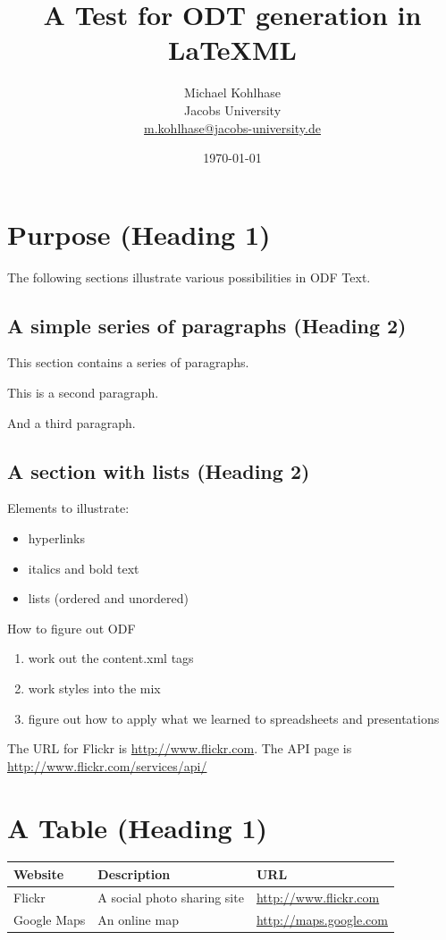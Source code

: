 \documentclass{article}
\title{A Test for ODT generation in LaTeXML}
\author{Michael Kohlhase\\Jacobs University\\\url{m.kohlhase@jacobs-university.de}}
\date{\today}
\begin{document}
\maketitle

\section{Purpose (Heading 1)}

The following sections illustrate various possibilities in ODF Text.

\subsection{A simple series of paragraphs (Heading 2)}

This section contains a series of paragraphs.

This is a second paragraph.

And a third paragraph.

\subsection{A section with lists (Heading 2)}
Elements to illustrate:
\begin{itemize}
\item hyperlinks
\item italics and bold text
\item lists (ordered and unordered)
\end{itemize}
How to figure out ODF
\begin{enumerate}
\item work out the content.xml tags
\item  work styles into the mix
\item  figure out how to apply what we learned to spreadsheets and presentations
\end{enumerate}
The URL for Flickr is \url{http://www.flickr.com}.  The API page is \url{http://www.flickr.com/services/api/}

\section{A Table (Heading 1)}
\begin{tabular}{|l|l|l|}\hline
  Website & Description & URL \\\hline
  Flickr & A social photo sharing site & \url{http://www.flickr.com}\\\hline 
  Google Maps & An online map & \url{http://maps.google.com}\\\hline
\end{tabular}
\end{document}
